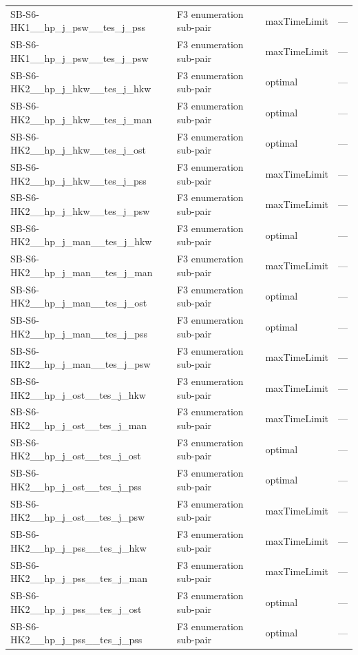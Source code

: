 \begin{table}[htbp]
\begin{tabular}{lllr}
  SB-S6-HK1\_\_hp\_j\_psw\_\_tes\_j\_pss & F3 enumeration sub-pair & maxTimeLimit & — \\
  SB-S6-HK1\_\_hp\_j\_psw\_\_tes\_j\_psw & F3 enumeration sub-pair & maxTimeLimit & — \\
  SB-S6-HK2\_\_hp\_j\_hkw\_\_tes\_j\_hkw & F3 enumeration sub-pair & optimal & — \\
  SB-S6-HK2\_\_hp\_j\_hkw\_\_tes\_j\_man & F3 enumeration sub-pair & optimal & — \\
  SB-S6-HK2\_\_hp\_j\_hkw\_\_tes\_j\_ost & F3 enumeration sub-pair & optimal & — \\
  SB-S6-HK2\_\_hp\_j\_hkw\_\_tes\_j\_pss & F3 enumeration sub-pair & maxTimeLimit & — \\
  SB-S6-HK2\_\_hp\_j\_hkw\_\_tes\_j\_psw & F3 enumeration sub-pair & maxTimeLimit & — \\
  SB-S6-HK2\_\_hp\_j\_man\_\_tes\_j\_hkw & F3 enumeration sub-pair & optimal & — \\
  SB-S6-HK2\_\_hp\_j\_man\_\_tes\_j\_man & F3 enumeration sub-pair & maxTimeLimit & — \\
  SB-S6-HK2\_\_hp\_j\_man\_\_tes\_j\_ost & F3 enumeration sub-pair & optimal & — \\
  SB-S6-HK2\_\_hp\_j\_man\_\_tes\_j\_pss & F3 enumeration sub-pair & optimal & — \\
  SB-S6-HK2\_\_hp\_j\_man\_\_tes\_j\_psw & F3 enumeration sub-pair & maxTimeLimit & — \\
  SB-S6-HK2\_\_hp\_j\_ost\_\_tes\_j\_hkw & F3 enumeration sub-pair & maxTimeLimit & — \\
  SB-S6-HK2\_\_hp\_j\_ost\_\_tes\_j\_man & F3 enumeration sub-pair & maxTimeLimit & — \\
  SB-S6-HK2\_\_hp\_j\_ost\_\_tes\_j\_ost & F3 enumeration sub-pair & optimal & — \\
  SB-S6-HK2\_\_hp\_j\_ost\_\_tes\_j\_pss & F3 enumeration sub-pair & optimal & — \\
  SB-S6-HK2\_\_hp\_j\_ost\_\_tes\_j\_psw & F3 enumeration sub-pair & maxTimeLimit & — \\
  SB-S6-HK2\_\_hp\_j\_pss\_\_tes\_j\_hkw & F3 enumeration sub-pair & maxTimeLimit & — \\
  SB-S6-HK2\_\_hp\_j\_pss\_\_tes\_j\_man & F3 enumeration sub-pair & maxTimeLimit & — \\
  SB-S6-HK2\_\_hp\_j\_pss\_\_tes\_j\_ost & F3 enumeration sub-pair & optimal & — \\
  SB-S6-HK2\_\_hp\_j\_pss\_\_tes\_j\_pss & F3 enumeration sub-pair & optimal & — \\

\end{tabular}
\end{table}
